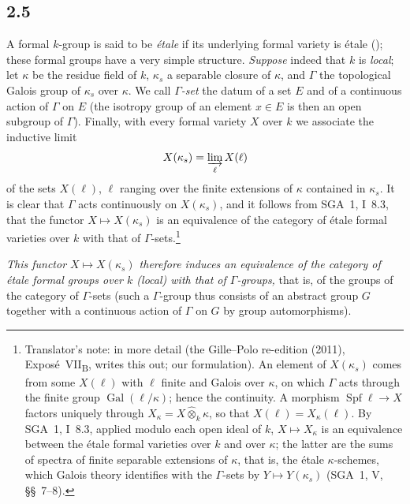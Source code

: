 
\subsection*{2.5}
\label{sga3:VIIB:2.5}

A formal \(k\)-group is said to be \emph{étale} if its underlying
formal variety is étale \textup{()}; these formal groups have a very
simple structure. \emph{Suppose} indeed that \(k\) is \emph{local}; let
\(\kappa\) be the residue field of \(k\), \(\kappa_s\) a separable
closure of \(\kappa\), and \(\Gamma\) the topological Galois group of
\(\kappa_s\) over \(\kappa\). We call \emph{\(\Gamma\)-set} the datum of a
set \(E\) and of a continuous action of \(\Gamma\) on \(E\) \textup{(}the
isotropy group of an element \(x\in E\) is then an open subgroup of
\(\Gamma\)\textup{)}. Finally, with every formal variety \(X\) over \(k\)
we associate the inductive limit
\[
  X(\kappa_s)
  =
  \varinjlim_{\ell}X(\ell)
\]
of the sets \(X(\ell)\), \(\ell\) ranging over the finite extensions of
\(\kappa\) contained in \(\kappa_s\). It is clear that \(\Gamma\) acts
continuously on \(X(\kappa_s)\), and it follows from SGA~1, I~8.3, that
the functor \(X\mapsto X(\kappa_s)\) is an equivalence of the category
of étale formal varieties over \(k\) with that of \(\Gamma\)-sets.\footnote{Translator's
note: in more detail (the Gille--Polo re-edition (2011), Expos\'e~VII\textsubscript{B}, writes this out; our
formulation). An element of \(X(\kappa_s)\) comes from some \(X(\ell)\) with \(\ell\) finite and Galois over
\(\kappa\), on which \(\Gamma\) acts through the finite group \(\operatorname{Gal}(\ell/\kappa)\); hence the
continuity. A morphism \(\operatorname{Spf}\ell\to X\) factors uniquely through
\(X_\kappa=X\widehat\otimes_k\kappa\), so that \(X(\ell)=X_\kappa(\ell)\). By SGA~1, I~8.3, applied modulo
each open ideal of \(k\), \(X\mapsto X_\kappa\) is an equivalence between the étale formal varieties over
\(k\) and over \(\kappa\); the latter are the sums of spectra of finite separable extensions of
\(\kappa\), that is, the étale \(\kappa\)-schemes, which Galois theory identifies with the
\(\Gamma\)-sets by \(Y\mapsto Y(\kappa_s)\) (SGA~1, V, \S\S~7--8).}

\medskip
\noindent
{}
\label{sga3:VIIB:2.5:proposition}
{\itshape This functor \(X\mapsto X(\kappa_s)\) therefore induces an
equivalence of the category of étale formal groups over \(k\)
\textup{(}local\textup{)} with that of \(\Gamma\)-groups,} that is, of the
groups of the category of \(\Gamma\)-sets \textup{(}such a
\(\Gamma\)-group thus consists of an abstract group \(G\) together with
a continuous action of \(\Gamma\) on \(G\) by group automorphisms\textup{)}.

